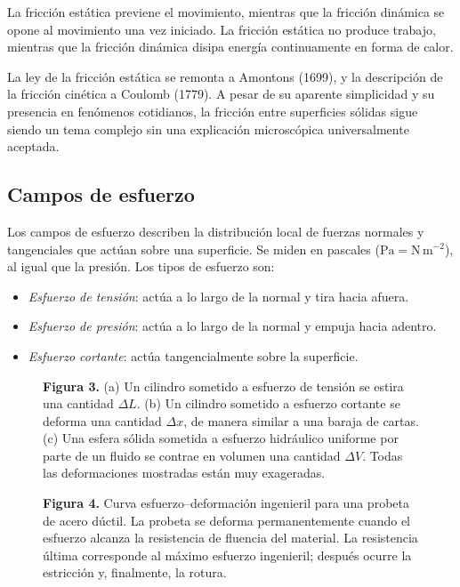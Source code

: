 La fricción estática previene el movimiento, mientras que la fricción dinámica se opone al movimiento una vez iniciado. La fricción estática no produce trabajo, mientras que la fricción dinámica disipa energía continuamente en forma de calor.

La ley de la fricción estática se remonta a Amontons (1699), y la descripción de la fricción cinética a Coulomb (1779). A pesar de su aparente simplicidad y su presencia en fenómenos cotidianos, la fricción entre superficies sólidas sigue siendo un tema complejo sin una explicación microscópica universalmente aceptada.

\subsection{Campos de esfuerzo}

Los campos de esfuerzo describen la distribución local de fuerzas normales y tangenciales que actúan sobre una superficie. Se miden en pascales ($\mathrm{Pa} = \mathrm{N\,m^{-2}}$), al igual que la presión. Los tipos de esfuerzo son:

\begin{itemize}
\item \emph{Esfuerzo de tensión}: actúa a lo largo de la normal y tira hacia afuera.
\item \emph{Esfuerzo de presión}: actúa a lo largo de la normal y empuja hacia adentro.
\item \emph{Esfuerzo cortante}: actúa tangencialmente sobre la superficie.
\end{itemize}

\begin{figure}[H]
\centering

\par\medskip
\textbf{Figura 3.} (a) Un cilindro sometido a esfuerzo de tensión se estira una cantidad $\Delta L$. (b) Un cilindro sometido a esfuerzo cortante se deforma una cantidad $\Delta x$, de manera similar a una baraja de cartas. (c) Una esfera sólida sometida a esfuerzo hidráulico uniforme por parte de un fluido se contrae en volumen una cantidad $\Delta V$. Todas las deformaciones mostradas están muy exageradas.
\end{figure}

\begin{figure}[H]
\centering

\par\medskip
\textbf{Figura 4.} Curva esfuerzo–deformación ingenieril para una probeta de acero dúctil. La probeta se deforma permanentemente cuando el esfuerzo alcanza la resistencia de fluencia del material. La resistencia última corresponde al máximo esfuerzo ingenieril; después ocurre la estricción y, finalmente, la rotura.
\end{figure}


